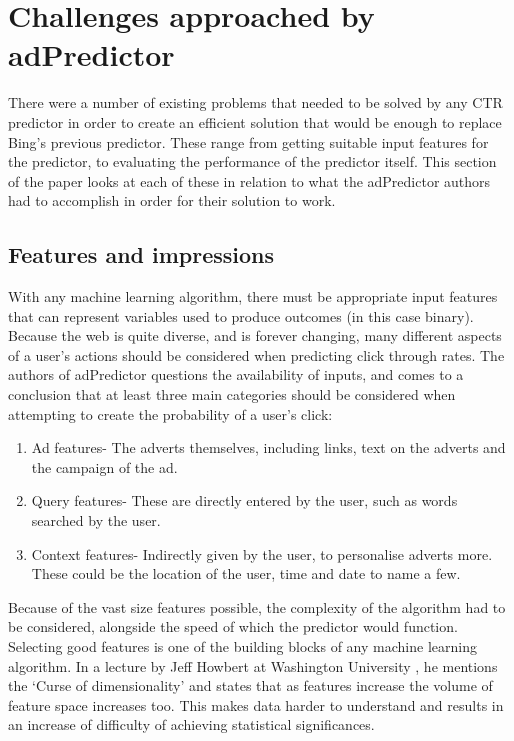 \documentclass[journal]{IEEEtran}
\begin{document}
\section{Challenges approached by adPredictor}
There were a number of existing problems that needed to be solved by any CTR predictor in order to create an efficient solution that would be enough to replace Bing’s previous predictor. These range from getting suitable input features for the predictor, to evaluating the performance of the predictor itself. This section of the paper looks at each of these in relation to what the adPredictor authors had to accomplish in order for their solution to work.

\subsection{Features and impressions}
With any machine learning algorithm, there must be appropriate input features that can represent variables used to produce outcomes (in this case binary). Because the web is quite diverse, and is forever changing, many different aspects of a user’s actions should be considered when predicting click through rates. The authors of adPredictor questions the availability of inputs, and comes to a conclusion that at least three main categories should be considered when attempting to create the probability of a user’s click:
\begin{enumerate}
\item Ad features- The adverts themselves, including links, text on the adverts and the campaign of the ad.
\item Query features- These are directly entered by the user, such as words searched by the user.
\item Context features- Indirectly given by the user, to personalise adverts more. These could be the location of the user, time and date to name a few.
\end{enumerate}
Because of the vast size features possible, the complexity of the algorithm had to be considered, alongside the speed of which the predictor would function. Selecting good features is one of the building blocks of any machine learning algorithm. In a lecture by Jeff Howbert at Washington University \cite{washington}, he mentions the ‘Curse of dimensionality’ and states that as features increase the volume of feature space increases too. This makes data harder to understand and results in an increase of difficulty of achieving statistical significances.
\end{document}
